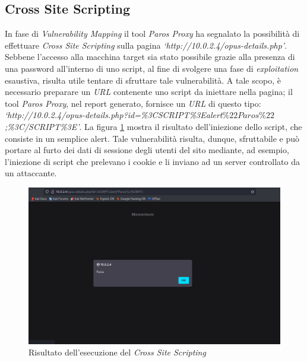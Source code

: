 \subsection{Cross Site Scripting}
In fase di \emph{Vulnerability Mapping} il tool \emph{Paros Proxy} ha segnalato la possibilità di effettuare \emph{Cross Site Scripting} sulla pagina \emph{`http://10.0.2.4/opus-details.php'}.  
Sebbene l'accesso alla macchina target sia stato possibile grazie alla presenza di una password all'interno di uno script, al fine di svolgere una fase di \emph{exploitation} esaustiva, risulta utile tentare di sfruttare tale vulnerabilità. A tale scopo, è necessario preparare un \emph{URL} contenente uno script da iniettare nella pagina; il tool \emph{Paros Proxy}, nel report generato, fornisce un \emph{URL} di questo tipo: \emph{`http://10.0.2.4/opus-details.php?id=\%3CSCRIPT\%3Ealert\(\%22Paros\%22\);\%3C/SCRIPT\%3E'}. La figura \ref{fig:xss} mostra il risultato dell'iniezione dello script, che consiste in un semplice alert. Tale vulnerabilità risulta, dunque, sfruttabile e può portare al furto dei dati di sessione degli utenti del sito mediante, ad esempio, l'iniezione di script che prelevano i cookie e li inviano ad un server controllato da un attaccante.
\begin{figure}[h]
    \centering
    \includegraphics[scale=0.4]{capitoli/images/xss.png}
    \caption{Risultato dell'esecuzione del \emph{Cross Site Scripting}}
    \label{fig:xss}
\end{figure}
